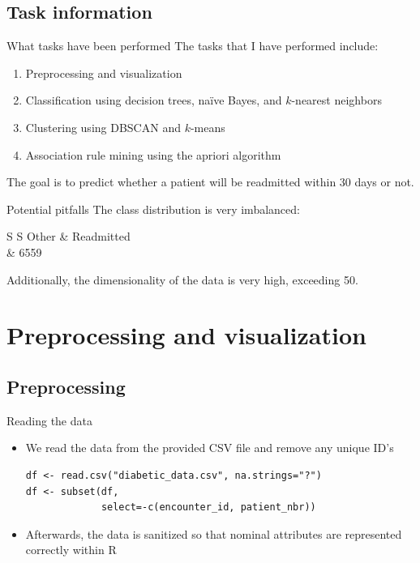 \documentclass[serif, hyperref={unicode}, xcolor={x11names, psnames, dvipsnames,
  table}, usepdftitle=false]{beamer}
\begin{document}
\subsection{Task information}
\begin{frame}{What tasks have been performed}
  The tasks that I have performed include:
  \begin{enumerate}
  \item Preprocessing and visualization
  \item Classification using decision trees, na\"i{}ve Bayes, and $k$-nearest
    neighbors
  \item Clustering using DBSCAN and $k$-means
  \item Association rule mining using the apriori algorithm
  \end{enumerate}

  The goal is to predict whether a patient will be readmitted within \num{30}
  days or not.
\end{frame}

\begin{frame}{Potential pitfalls}
  The class distribution is very imbalanced:
  \begin{table}[!h]
    \begin{tabular}{S S}
      \toprule
      {Other} & {Readmitted} \\
       & 6559 \\
      \bottomrule
    \end{tabular}
  \end{table}

  Additionally, the dimensionality of the data is very high, exceeding \num{50}.
\end{frame}

\section{Preprocessing and visualization}

\subsection{Preprocessing}
\begin{frame}[fragile]{Reading the data}
  \begin{itemize}
  \item We read the data from the provided CSV file and remove any unique ID's
\begin{verbatim}
df <- read.csv("diabetic_data.csv", na.strings="?")
df <- subset(df,
             select=-c(encounter_id, patient_nbr))
\end{verbatim}
  \item Afterwards, the data is sanitized so that nominal attributes are
    represented correctly within R
  \end{itemize}
\end{frame}
\end{document}
